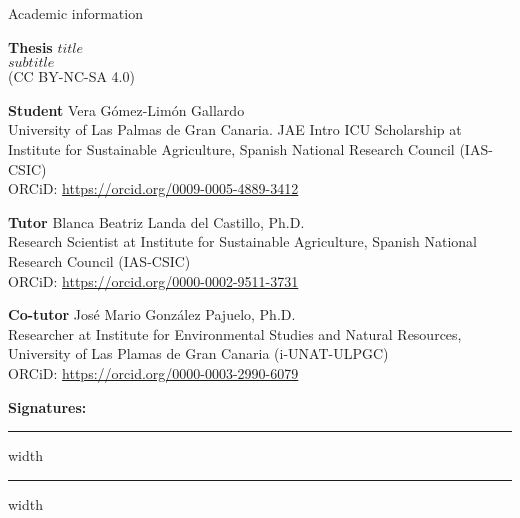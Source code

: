 \begin{flushleft}
  \Large
    Academic information
        
  \vspace{0.5cm}
  \normalsize
  \textbf{Thesis}
    $title$\\
    $subtitle$\\
    (CC BY-NC-SA 4.0)

  
  \vspace{0.5cm}
  \textbf{Student}
    Vera Gómez-Limón Gallardo\\
    University of Las Palmas de Gran Canaria. JAE Intro ICU Scholarship at Institute for Sustainable Agriculture, Spanish National Research Council (IAS-CSIC)\\
    ORCiD: \url{https://orcid.org/0009-0005-4889-3412}
  
  \vspace{0.5cm}
  \textbf{Tutor}
    Blanca Beatriz Landa del Castillo, Ph.D.\\
    Research Scientist at Institute for Sustainable Agriculture, Spanish National Research Council (IAS-CSIC)\\
    ORCiD: \url{https://orcid.org/0000-0002-9511-3731}
  
  \vspace{0.5cm}
  \textbf{Co-tutor}
    José Mario González Pajuelo, Ph.D.\\
    Researcher at Institute for Environmental Studies and Natural Resources, University of Las Plamas de Gran Canaria (i-UNAT-ULPGC)\\
    ORCiD: \url{https://orcid.org/0000-0003-2990-6079}
  
  \vspace{1.0cm}
  \centerline{\textbf{Signatures:}}
  
  \vspace{0.5cm}
  \hrule height 0.4pt width \textwidth
  \vfill
  \hrule height 0.4pt width \textwidth
\end{flushleft}